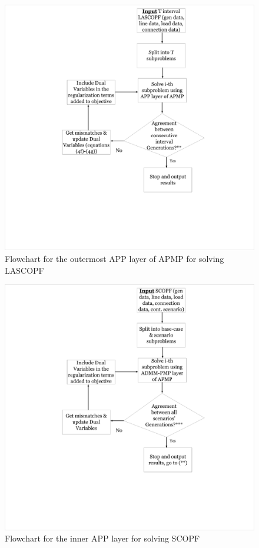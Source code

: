 \documentclass[preprint,12pt,3p]{elsarticle}
\begin{document}
\begin{figure}
\begin{center}
\vspace*{-2cm}
\hspace*{-4cm}
\includegraphics[width=0.92\linewidth,trim=5mm 12mm 5mm 5mm, clip]{OutermostAPP.pdf}
\caption{Flowchart for the outermost APP layer of APMP for solving LASCOPF}
\label{outermostAPP}
\end{center}
\end{figure}
\begin{figure}
\begin{center}
\vspace*{-2cm}
\hspace*{-4cm}
\includegraphics[width=0.92\linewidth,trim=5mm 12mm 5mm 5mm, clip]{SCOPFAPP.pdf}
\caption{Flowchart for the inner APP layer for solving SCOPF}
\label{SCOPFAPP}
\end{center}
\end{figure}
\end{document}
